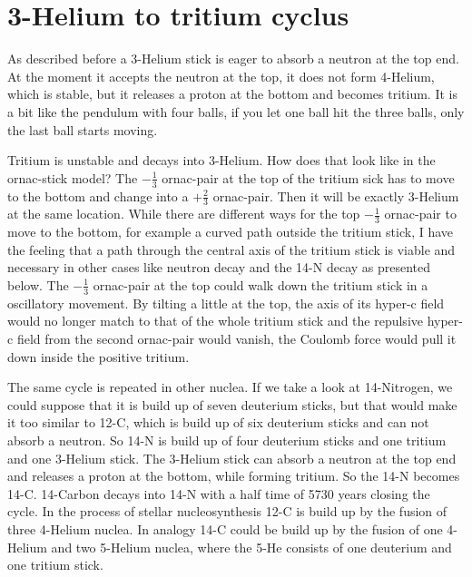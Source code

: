 \section{3-Helium to tritium cyclus}

As described before a 3-Helium stick is eager to absorb a neutron at the top end. At the moment it accepts the neutron at the top, it does not form 4-Helium, which is stable, but it releases a proton at the bottom and becomes tritium. It is a bit like the pendulum with four balls, if you let one ball hit the three balls, only the last ball starts moving. 

Tritium is unstable and decays into 3-Helium. How does that look like in the ornac-stick model? The $-\frac{1}{3}$ ornac-pair at the top of the tritium sick has to move to the bottom and change into a  $+\frac{2}{3}$ ornac-pair. Then it will be exactly 3-Helium at the same location. While there are different ways for the top  $-\frac{1}{3}$ ornac-pair to move to the bottom, for example a curved path outside the tritium stick, I have the feeling that a path through the central axis of the tritium stick is viable and necessary in other cases like neutron decay and the 14-N decay as presented below. The $-\frac{1}{3}$ ornac-pair at the top could walk down the tritium stick in a oscillatory movement. By tilting a little at the top, the axis of its hyper-c field would no longer match to that of the whole tritium stick and the repulsive hyper-c field from the second ornac-pair would vanish, the Coulomb force would pull it down inside the positive tritium.

The same cycle is repeated in other nuclea. If we take a look at 14-Nitrogen, we could suppose that it is build up of seven deuterium sticks, but that would make it too similar to 12-C, which is build up of six deuterium sticks and can not absorb a neutron. So 14-N is build up of four deuterium sticks and one tritium and one 3-Helium stick. The 3-Helium stick can absorb a neutron at the top end and releases a proton at the bottom, while forming tritium. So the 14-N becomes 14-C. 14-Carbon decays into 14-N with a half time of 5730 years closing the cycle.
In the process of stellar nucleosynthesis 12-C is build up by the fusion of three 4-Helium nuclea. In analogy 14-C could be build up by the fusion of one 4-Helium and two 5-Helium nuclea, where the 5-He consists of one deuterium and one tritium stick.



